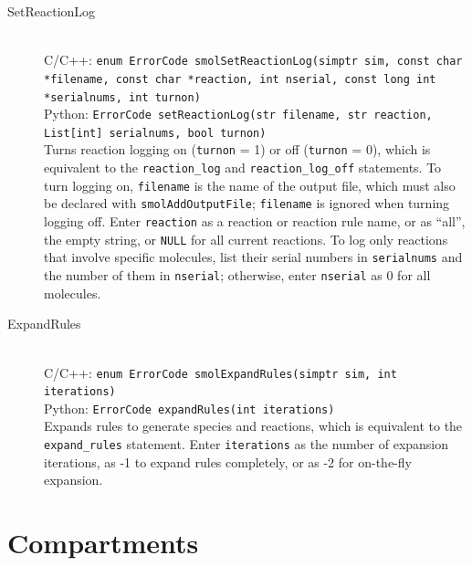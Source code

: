\documentclass {scrbook}
\newcommand {\ttt} {\texttt}
\begin{document}
\begin{description}
\item[SetReactionLog]
\hfill \\
C/C++: \ttt{enum ErrorCode smolSetReactionLog(simptr sim, const char *filename, const char *reaction, int nserial, const long int *serialnums, int turnon)}\\
Python: \ttt{ErrorCode setReactionLog(str filename, str reaction, List[int] serialnums, bool turnon)}\\
Turns reaction logging on (\ttt{turnon} = 1) or off (\ttt{turnon} = 0), which is equivalent to the \ttt{reaction\_log} and \ttt{reaction\_log\_off} statements. To turn logging on, \ttt{filename} is the name of the output file, which must also be declared with \ttt{smolAddOutputFile}; \ttt{filename} is ignored when turning logging off. Enter \ttt{reaction} as a reaction or reaction rule name, or as ``all'', the empty string, or \ttt{NULL} for all current reactions. To log only reactions that involve specific molecules, list their serial numbers in \ttt{serialnums} and the number of them in \ttt{nserial}; otherwise, enter \ttt{nserial} as 0 for all molecules.

\item[ExpandRules]
\hfill \\
C/C++: \ttt{enum ErrorCode smolExpandRules(simptr sim, int iterations)}\\
Python: \ttt{ErrorCode expandRules(int iterations)}\\
Expands rules to generate species and reactions, which is equivalent to the \ttt{expand\_rules} statement. Enter \ttt{iterations} as the number of expansion iterations, as -1 to expand rules completely, or as -2 for on-the-fly expansion.

\end{description}

\section{Compartments}
\end{document}
